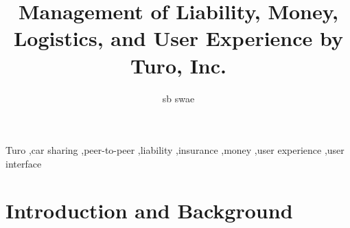 \documentclass[preprint,12pt]{elsarticle}
\begin{document}
\begin{frontmatter}


\title{Management of Liability, Money, Logistics, and User Experience by Turo, Inc.}




\author{sb swae}

\address{\href{mailto:sb.swae@gmail.com}{sb.swae@gmail.com}; \url{https://swaevior.io}}

\begin{abstract}
\blindtext
\end{abstract}

\begin{keyword}
Turo \sep car sharing \sep peer-to-peer \sep liability \sep insurance \sep money \sep user experience \sep user interface


\end{keyword}

\end{frontmatter}

\linenumbers

\section{Introduction and Background}
\label{S:1}
\end{document}
